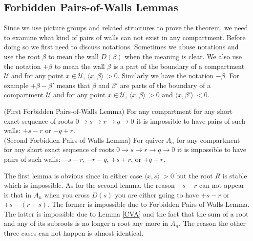 \subsection{Forbidden Pairs-of-Walls Lemmas}
\indent Since we use picture groups and related structures to prove the theorem, we need to examine what kind of pairs of walls can not exist in any compartment. Before doing so we first need to discuss notations. Sometimes we abuse notations and use the root $\beta$ to mean the wall $D(\beta)$ when the meaning is clear. We also use the notation $+\beta$ to mean the wall $\beta$ is a part of the boundary of a compartment $\mathcal{U}$ and for any point $x\in\mathcal{U}$, $\langle x,\beta\rangle\ >0$. Similarly we have the notation $-\beta$. For example $+\beta-\beta'$ means that $\beta$ and $\beta'$ are parts of the boundary of a compartment $\mathcal{U}$ and for any point $x\in\mathcal{U}$, $\langle x,\beta\rangle\ >0$ and $\langle x,\beta'\rangle\ <0$.\\
\begin{lemma}
(First Forbidden Pairs-of-Walls Lemma) For any compartment for any short exact sequence of roots $0\rightarrow s\rightarrow r\rightarrow q\rightarrow 0$ it is impossible to have pairs of such walls: $+s-r$ or $-q+r$.\\
(Second Forbidden Pairs-of-Walls Lemma) For quiver $A_n$ for any compartment for any short exact sequence of roots $0\rightarrow s\rightarrow r\rightarrow q\rightarrow 0$ it is impossible to have pairs of such walls: $-s-r$, $-r-q$, $+s+r$, or $+q+r$.\\
\end{lemma}
\indent The first lemma is obvious since in either case $\langle x,s\rangle\ >0$ but the root $R$ is stable which is impossible. As for the second lemma, the reason $-s-r$ can not appear is that in $A_n$ when you cross $D(s)$ you are either going to have $+s-r$ or $+s-(r+s)$. The former is impossible due to Forbidden Pairs-of-Walls Lemma. The latter is impossible due to Lemma \ref{CVA} and the fact that the sum of a root and any of its subroots is no longer a root any more in $A_n$. The reason the other three cases can not happen is almost identical.\\
